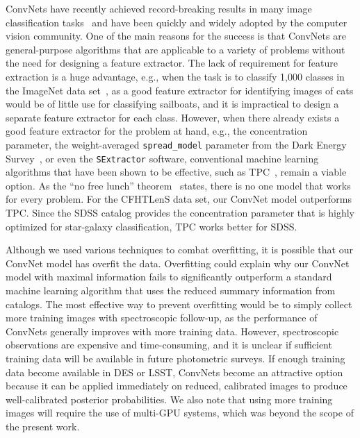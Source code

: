 \documentclass[fleqn,usenatbib]{mnras}
\newcommand{\eg}{{e.g., }}
\begin{document}
ConvNets have recently achieved record-breaking results in many image
classification tasks~\citep{lecun2015deep} and have been quickly and widely
adopted by the computer vision community.
One of the main reasons for the success is that ConvNets are general-purpose
algorithms that are applicable to a variety of problems without the need for
designing a feature extractor.
The lack of requirement for feature extraction is a huge advantage, \eg
when the task is to classify 1,000 classes in the ImageNet data
set~\citep{russakovsky2015imagenet},
as a good feature extractor for identifying images of cats would be of little use
for classifying sailboats, and it is impractical to design a separate
feature extractor for each class.
However, when there already exists a good feature extractor for the problem
at hand, \eg the concentration parameter, the weight-averaged
\texttt{spread\_model} parameter from the Dark Energy
Survey~\citep{desai2012blanco,crocce2016galaxy},
or even the \texttt{SExtractor} software,
conventional machine learning algorithms that have been shown to be effective,
such as TPC~\citep{carrascokind2013tpz, kim2015hybrid}, remain a viable option.
As the ``no free lunch'' theorem~\citep{wolpert1996lack} states,
there is no one model that works for every problem.
For the CFHTLenS data set, our ConvNet model outperforms TPC.
Since the SDSS catalog provides the concentration parameter that is highly
optimized for star-galaxy classification, TPC works better for SDSS.

Although we used various techniques to combat overfitting,
it is possible that our ConvNet model has overfit the data.
Overfitting could explain why our ConvNet model with maximal information
fails to significantly outperform a standard machine learning algorithm
that uses the reduced summary information from catalogs.
The most effective way to prevent overfitting would be to simply collect more training images
with spectroscopic follow-up, as the performance of ConvNets generally
improves with more training data.
However, spectroscopic observations are expensive and time-consuming,
and it is unclear if sufficient training data will be available
in future photometric surveys.
If enough training data become available in DES or LSST, ConvNets
become an attractive option because it can be applied immediately on reduced, calibrated images
to produce well-calibrated posterior probabilities.
We also note that using more training images will require the use of multi-GPU systems,
which was beyond the scope of the present work.
\end{document}
